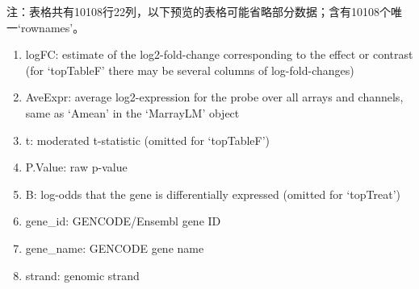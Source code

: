 \documentclass[
]{article}
\providecommand{\tightlist}{%
  \setlength{\itemsep}{0pt}\setlength{\parskip}{0pt}}
\begin{document}
\begin{center}\begin{tcolorbox}[colback=gray!10, colframe=gray!50, width=0.9\linewidth, arc=1mm, boxrule=0.5pt]注：表格共有10108行22列，以下预览的表格可能省略部分数据；含有10108个唯一`rownames'。
\end{tcolorbox}
\end{center}
\begin{center}\begin{tcolorbox}[colback=gray!10, colframe=gray!50, width=0.9\linewidth, arc=1mm, boxrule=0.5pt]\begin{enumerate}\tightlist
\item logFC:  estimate of the log2-fold-change corresponding to the effect or contrast (for ‘topTableF’ there may be several columns of log-fold-changes)
\item AveExpr:  average log2-expression for the probe over all arrays and channels, same as ‘Amean’ in the ‘MarrayLM’ object
\item t:  moderated t-statistic (omitted for ‘topTableF’)
\item P.Value:  raw p-value
\item B:  log-odds that the gene is differentially expressed (omitted for ‘topTreat’)
\item gene\_id:  GENCODE/Ensembl gene ID
\item gene\_name:  GENCODE gene name
\item strand:  genomic strand
\end{enumerate}\end{tcolorbox}
\end{center}
\end{document}
